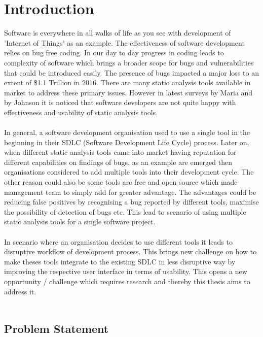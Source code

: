 \chapter{Introduction}
\label{ch:introduction}

Software is everywhere in all walks of life as you see with development of 'Internet of Things' as an example. The effectiveness of software development relies on bug free coding. In our day to day progress in coding leads to complexity of software which brings a broader scope for bugs and vulnerabilities that could be introduced easily. The presence of bugs impacted a major loss to an extent of  \$1.1 Trillion in 2016. \cite{report} There are many static analysis tools available in market to address these primary issues. However in latest surveys by Maria \etal{} \cite{CB16} and by Johnson \etal{} \cite{JSMB13} it is noticed that software developers are not quite happy with effectiveness and usability of static analysis tools.
\\ \\

In general, a software development organisation used to use a single tool in the beginning in their SDLC (Software Development Life Cycle) process. Later on, when different static analysis tools came into market having reputation for different capabilities on findings of bugs, as an example are emerged then organisations considered to add multiple tools into their development cycle. The other reason could also be some tools are free and open source which made management team to simply add for greater advantage. The advantages could be reducing false positives by recognising a bug reported by different tools, maximise the possibility of detection of bugs etc. This lead to scenario of using multiple static analysis tools for a single software project.
\\ \\

In scenario where an organisation decides to use different tools it leads to disruptive workflow of development process. This brings new challenge on how to make theses tools integrate to the existing SDLC in less disruptive way by improving the respective user interface in terms of usability. This opens a new opportunity / challenge which requires research and thereby this thesis aims to address it.
\\ \\

\section{Problem Statement}

